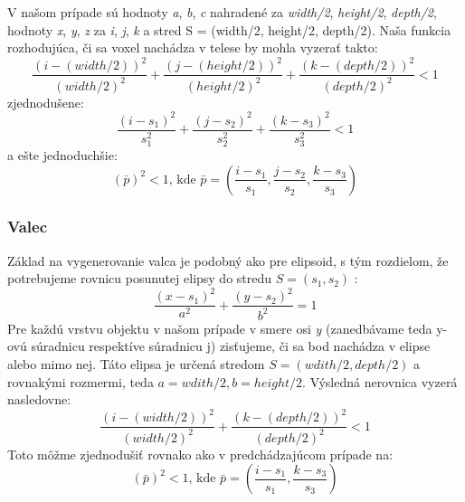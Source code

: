 	V našom prípade sú hodnoty \textit{a}, \textit{b}, \textit{c} nahradené za \textit{width/2}, \textit{height/2}, \textit{depth/2}, hodnoty \textit{x}, \textit{y}, \textit{z} za \textit{i}, \textit{j}, \textit{k} a stred S = (width/2, height/2, depth/2). Naša funkcia rozhodujúca, či sa voxel nachádza v telese by mohla vyzerať takto:
	\begin{displaymath}
		\frac{(i - (width/2))^2}{(width/2)^2} + \frac{(j-(height/2))^2}{(height/2)^2}+ \frac{(k - (depth/2)) ^2}{(depth/2)^2} < 1 
	\end{displaymath}
	zjednodušene:
	\begin{displaymath}
			\frac{(i - s_1)^2}{s_1^2} + \frac{(j-s_2)^2}{s_2^2}+ \frac{(k - s_3) ^2}{s_3^2} < 1 
	\end{displaymath}
	a ešte jednoduchšie:
	\begin{displaymath}
		(\bar{p})^2 < 1 \textrm{, kde }
		\bar{p} = (\frac{i - s_1}{s_1}, \frac{j - s_2}{s_2}, \frac{k - s_3}{s_3}) 
	\end{displaymath}
	\subsubsection{Valec}
	Základ na vygenerovanie valca je podobný ako pre elipsoid, s tým rozdielom, že potrebujeme rovnicu posunutej elipsy do stredu \begin{math}S = (s_1, s_2)\end{math} :
	\begin{displaymath}
		\frac{(x - s_1)^2}{a^2} + \frac{(y - s_2)^2}{b^2} = 1 
	\end{displaymath}
	Pre každú vrstvu objektu v našom prípade v smere osi \textit{y} (zanedbávame teda y-ovú súradnicu respektíve súradnicu j) zisťujeme, či sa bod nachádza v elipse alebo mimo nej. Táto elipsa je určená stredom \begin{math}S = (wdith/2, depth/2)\end{math} a rovnakými rozmermi, teda \begin{math}a = wdith/2, b = height/2\end{math}. Výsledná nerovnica vyzerá nasledovne:
	\begin{displaymath}
		\frac{(i - (width/2))^2}{(width/2)^2} + \frac{(k - (depth/2)) ^2}{(depth/2)^2} < 1  
	\end{displaymath}
	Toto môžme zjednodušiť rovnako ako v predchádzajúcom prípade na:
	\begin{displaymath}
		(\bar{p})^2 < 1 \textrm{, kde }
		\bar{p} = (\frac{i - s_1}{s_1},\frac{k - s_3}{s_3})
	\end{displaymath}	
